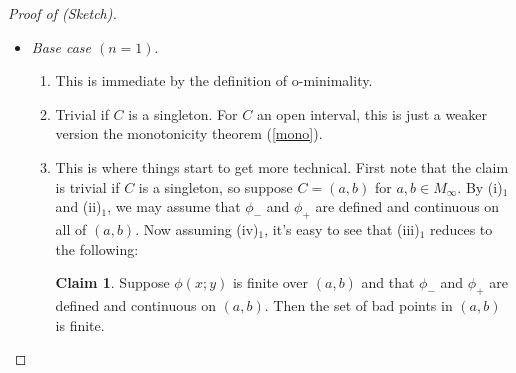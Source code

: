 \documentclass[a4paper]{report}
\theoremstyle{definition}
\theoremstyle{remstyle}
\newtheorem*{claim*}{Claim}
\begin{document}
\begin{proof}[Proof of  (Sketch)]\
	\begin{itemize}[leftmargin=*,itemsep=12pt]
		\item \emph{Base case $(n=1)$}.
		      \begin{enumerate}[itemsep=12pt,label=(\roman*)$_1$]
			      \item This is immediate by the definition of o-minimality.
			      \item Trivial if $C$ is a singleton. For $C$ an open interval, this is just a weaker version the monotonicity theorem (\ref{mono}).
			      \item This is where things start to get more technical. First note that the claim is trivial if $C$ is a singleton, so suppose $C=(a,b)$ for $a,b\in M_{\infty}$. By (i)$_1$ and (ii)$_1$, we may assume that $\phi_-$ and $\phi_+$ are defined and continuous on all of $(a,b)$. Now assuming (iv)$_1$, it's easy to see that (iii)$_1$ reduces to the following:

			            \begin{claim*}
				            Suppose $\phi(x;y)$ is finite over $(a,b)$ and that $\phi_-$ and $\phi_+$ are defined and continuous on $(a,b)$. Then the set of bad points in $(a,b)$ is finite.
			            \end{claim*}


\end{enumerate}
\end{itemize}
\end{proof}
\end{document}

